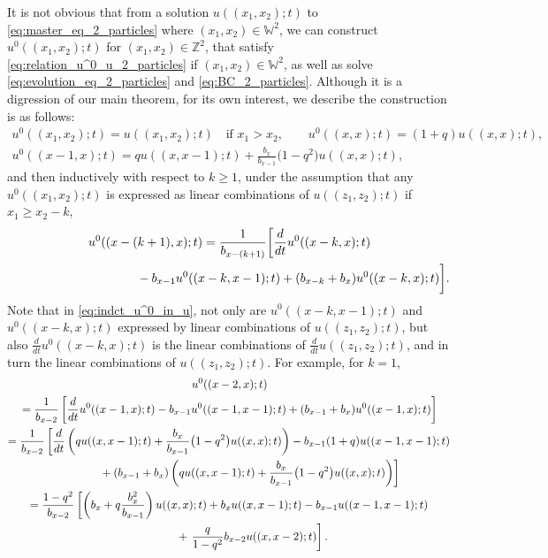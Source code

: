 \documentclass[11pt]{article}
\numberwithin{equation}{section}
\newcommand{\intZ}{\mathbb{Z}}
\newcommand{\Weylchamber}{\mathbb{W}}
\begin{document}
\begin{Remark} \label{rmk:inverse_2pt}
 It is not obvious that from a solution $u((x_1, x_2); t)$ to \eqref{eq:master_eq_2_particles} where $(x_1, x_2) \in \Weylchamber^2$, we can construct $u^0((x_1, x_2); t)$ for $(x_1, x_2) \in \intZ^2$, that satisfy \eqref{eq:relation_u^0_u_2_particles} if $(x_1, x_2) \in \Weylchamber^2$, as well as solve \eqref{eq:evolution_eq_2_particles} and \eqref{eq:BC_2_particles}. Although it is a digression of our main theorem, for its own interest, we describe the construction is as follows:
\begin{gather*}
 u^0((x_1, x_2); t) = u((x_1, x_2); t) \quad \text{if $x_1 > x_2$}, \qquad u^0((x, x); t) = (1 + q) u((x, x); t), \\
 u^0((x - 1, x); t) = q u((x, x - 1); t) + \frac{b_x}{b_{x - 1}} \big(1 - q^2\big) u((x, x); t),
\end{gather*}
and then inductively with respect to $k \geq 1$, under the assumption that any $u^0((x_1, x_2); t)$ is expressed as linear combinations of $u((z_1, z_2); t)$ if $x_1 \geq x_2 - k$,
\begin{gather}
 u^0((x - (k + 1), x); t) =
 \frac{1}{b_{x - (k + 1)}} \bigg[ \frac{d}{dt} u^0((x - k, x); t) \nonumber\\
 \hphantom{u^0((x - (k + 1), x); t) = }{} - b_{x - 1} u^0((x - k, x - 1); t) + (b_{x - k} + b_x) u^0((x - k, x); t) \bigg].\label{eq:indct_u^0_in_u}
\end{gather}
Note that in \eqref{eq:indct_u^0_in_u}, not only are $u^0((x - k, x - 1); t)$ and $u^0((x - k, x); t)$ expressed by linear combinations of $u((z_1, z_2); t)$, but also $\frac{d}{dt} u^0((x - k, x); t)$ is the linear combinations of $\frac{d}{dt} u((z_1, z_2); t)$, and in turn the linear combinations of $u((z_1, z_2); t)$. For example, for $k = 1$,
\begin{gather*}
   u^0((x - 2, x); t) \\
 =   \frac{1}{b_{x - 2}} \left[ \frac{d}{dt} u^0((x - 1, x); t) - b_{x - 1} u^0((x - 1, x - 1); t) + (b_{x - 1} + b_x) u^0((x - 1, x); t) \right] \\
 =   \frac{1}{b_{x - 2}} \left[ \frac{d}{dt} \left( q u((x, x - 1); t) + \frac{b_x}{b_{x - 1}} \big(1 - q^2\big) u((x, x); t) \right) - b_{x - 1} (1 + q) u((x - 1, x - 1); t) \right. \\
  \hphantom{=\frac{1}{b_{x - 2}}} \left. \vphantom{\frac{d}{dt}} + (b_{x - 1} + b_x) \left( q u((x, x - 1); t) + \frac{b_x}{b_{x - 1}} \big(1 - q^2\big) u((x, x); t) \right) \right] \\
 =   \frac{1 - q^2}{b_{x - 2}} \left[ \left( b_x + q \frac{b^2_x}{b_{x - 1}} \right) u((x, x); t) + b_x u((x, x - 1); t) - b_{x - 1} u((x - 1, x - 1); t) \right. \\
  \hphantom{=\frac{1 - q^2}{b_{x - 2}}} + \left. \frac{q}{1 - q^2} b_{x - 2} u((x, x - 2); t) \right].
\end{gather*}
\end{Remark}
\end{document}
